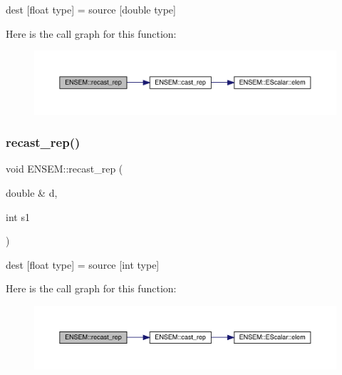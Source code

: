 dest \mbox{[}float type\mbox{]} = source \mbox{[}double type\mbox{]} 

Here is the call graph for this function\+:\nopagebreak
\begin{figure}[H]
\begin{center}
\leavevmode
\includegraphics[width=350pt]{dd/d99/group__simpleword_gad3aa40e2f2b149a85e571f6c4d757bac_cgraph}
\end{center}
\end{figure}
\mbox{\label{group__simpleword_gada8b742bcffe9ceeb7cc10b48a11a174}} 
\subsubsection{\texorpdfstring{recast\_rep()}{recast\_rep()}\hspace{0.1cm}{\footnotesize\ttfamily [4/6]}}
{\footnotesize\ttfamily void E\+N\+S\+E\+M\+::recast\+\_\+rep (\begin{DoxyParamCaption}\item[{double \&}]{d,  }\item[{int}]{s1 }\end{DoxyParamCaption})\hspace{0.3cm}{\ttfamily [inline]}}



dest \mbox{[}float type\mbox{]} = source \mbox{[}int type\mbox{]} 

Here is the call graph for this function\+:\nopagebreak
\begin{figure}[H]
\begin{center}
\leavevmode
\includegraphics[width=350pt]{dd/d99/group__simpleword_gada8b742bcffe9ceeb7cc10b48a11a174_cgraph}
\end{center}
\end{figure}
\mbox{\label{group__simpleword_ga78492af33f3095694863918e99ec9d6a}} 
